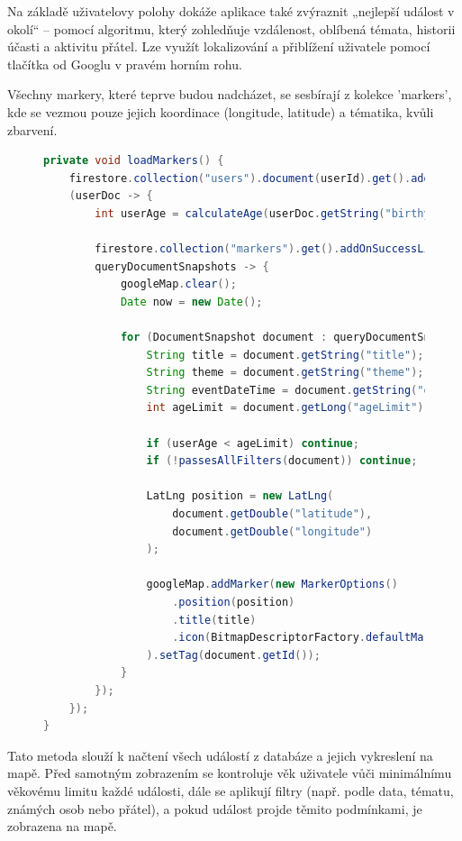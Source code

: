 Na základě uživatelovy polohy dokáže aplikace také zvýraznit „nejlepší událost v okolí“ – pomocí algoritmu, který zohledňuje vzdálenost, oblíbená témata, historii účasti a aktivitu přátel. Lze využít lokalizování a přiblížení uživatele pomocí tlačítka od Googlu v pravém horním rohu. 

Všechny markery, které teprve budou nadcházet, se sesbírají z kolekce 'markers', kde se vezmou pouze jejich koordinace (longitude, latitude) a tématika, kvůli zbarvení.



\begin{figure}[H]
    \centering
\begin{lstlisting}[language=Java, style=myJavaStyle, caption={Metoda \texttt{loadMarkers()} – načítání a filtrování událostí}, label={lst:loadMarkers}]
private void loadMarkers() {
    firestore.collection("users").document(userId).get().addOnSuccessListener
    (userDoc -> {
        int userAge = calculateAge(userDoc.getString("birthyear"));

        firestore.collection("markers").get().addOnSuccessListener(
        queryDocumentSnapshots -> {
            googleMap.clear();
            Date now = new Date();

            for (DocumentSnapshot document : queryDocumentSnapshots) {
                String title = document.getString("title");
                String theme = document.getString("theme");
                String eventDateTime = document.getString("eventDateTime");
                int ageLimit = document.getLong("ageLimit").intValue();

                if (userAge < ageLimit) continue;
                if (!passesAllFilters(document)) continue;

                LatLng position = new LatLng(
                    document.getDouble("latitude"),
                    document.getDouble("longitude")
                );

                googleMap.addMarker(new MarkerOptions()
                    .position(position)
                    .title(title)
                    .icon(BitmapDescriptorFactory.defaultMarker(getMarkerColor(theme)))
                ).setTag(document.getId());
            }
        });
    });
}
\end{lstlisting}
\end{figure}

Tato metoda slouží k načtení všech událostí z databáze a jejich vykreslení na mapě. Před samotným zobrazením se kontroluje věk uživatele vůči minimálnímu věkovému limitu každé události, dále se aplikují filtry (např. podle data, tématu, známých osob nebo přátel), a pokud událost projde těmito podmínkami, je zobrazena na mapě.

